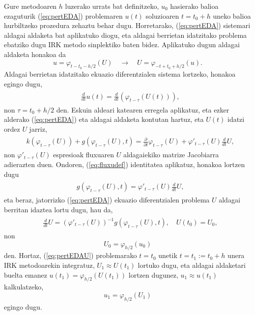 Gure metodoaren $h$ luzerako urrats bat definitzeko,  $u_0$ hasierako balioa ezaguturik (\ref{eq:pertEDA}) problemaren $u(t)$ soluzioaren $t=t_0+h$ uneko balioa hurbiltzeko prozedura zehaztu behar dugu. Horretarako,  (\ref{eq:pertEDA})  sistemari aldagai aldaketa bat aplikatuko diogu, eta aldagai berrietan idatzitako problema ebatziko dugu IRK metodo sinplektiko baten bidez. Aplikatuko dugun aldagai aldaketa honakoa da
\begin{equation*}
u = \varphi_{t-t_0-h/2}(U) \quad \to \quad U = \varphi_{-t+t_0+h/2}(u).
\end{equation*}
%
Aldagai berrietan idatzitako ekuazio diferentzialen sistema lortzeko, honakoa egingo dugu,
\begin{align}
\begin{split}
&\frac{d}{dt}u(t) = \frac{d}{dt}\left(\varphi_{t-\tau}(U(t))\right),
\end{split}
\end{align}
%
non $\tau = t_0+h/2$ den.
Eskuin aldeari katearen erregela aplikatuz, eta ezker alderako (\ref{eq:pertEDA}) eta aldagai aldaketa kontutan hartuz, eta $U(t)$ idatzi ordez $U$ jarriz,
\begin{align}
\begin{split}
&k\left(\varphi_{t-\tau}(U)\right) + g\left(\varphi_{t-\tau}(U),t \right) = \frac{\partial}{\partial t} \varphi_{t-\tau}(U) + \varphi'_{t-\tau}(U) \frac{d}{dt}U,
\end{split}
\end{align}
non $\varphi'_{t-\tau}(U)$ espresioak fluxuaren $U$ aldagaiekiko matrize Jacobiarra adierazten duen. Ondoren, (\ref{eq:fluxudef}) identitatea aplikatuz, honakoa lortzen dugu
\begin{align}
\begin{split}
&g\left(\varphi_{t-\tau}(U),t \right) =   \varphi'_{t-\tau}(U) \frac{d}{dt}U,
\end{split}
\end{align}
%
eta beraz, jatorrizko (\ref{eq:pertEDA}) ekuazio diferentzialen problema $U$ aldagai berritan idaztea lortu dugu, hau da,
\begin{align}
\begin{split}
\label{eq:pertEDAU}
&\frac{d}{dt} U = \left(\varphi'_{t-\tau}(U)\right)^{-1} g\left(\varphi_{t-\tau}(U),t \right), \quad U(t_0) = U_0,
\end{split}
\end{align}
%
non
\begin{equation*}
U_0 = \varphi_{h/2}(u_0)
\end{equation*}
%
den.  Hortaz, (\ref{eq:pertEDAU}) problemarako $t=t_0$ unetik $t=t_1:=t_0 + h$ unera IRK metodoarekin integratuz, $U_1 \approx U(t_1)$ lortuko dugu, eta
aldagai aldaketari buelta emanez $u(t_1) = \varphi_{h/2}(U(t_1))$ lortzen dugunez, $u_1 \approx u(t_1)$ kalkulatzeko,
\begin{equation*}
u_1 = \varphi_{h/2}(U_1)
\end{equation*}
%
egingo dugu.

